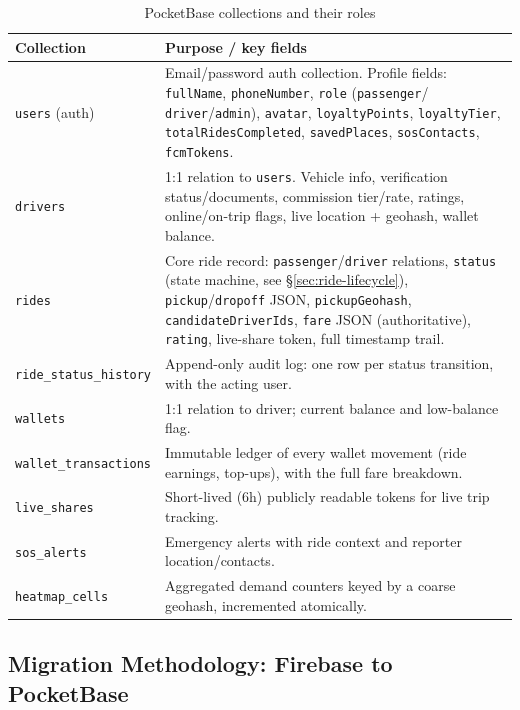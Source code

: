 \documentclass[11pt,a4paper]{article}
\begin{document}
\begin{table}[htbp]
\centering
\caption{PocketBase collections and their roles}
\label{tab:collections}
\begin{tabular}{@{}p{3.0cm}p{9.5cm}@{}}
\toprule
\textbf{Collection} & \textbf{Purpose / key fields} \\
\midrule
\texttt{users} (auth) & Email/password auth collection. Profile fields:
\texttt{fullName}, \texttt{phoneNumber}, \texttt{role} (\texttt{passenger}/
\texttt{driver}/\texttt{admin}), \texttt{avatar}, \texttt{loyaltyPoints},
\texttt{loyaltyTier}, \texttt{totalRidesCompleted}, \texttt{savedPlaces},
\texttt{sosContacts}, \texttt{fcmTokens}. \\
\texttt{drivers} & 1:1 relation to \texttt{users}. Vehicle info, verification
status/documents, commission tier/rate, ratings, online/on-trip flags,
live location + geohash, wallet balance. \\
\texttt{rides} & Core ride record: \texttt{passenger}/\texttt{driver} relations,
\texttt{status} (state machine, see \S\ref{sec:ride-lifecycle}),
\texttt{pickup}/\texttt{dropoff} JSON, \texttt{pickupGeohash},
\texttt{candidateDriverIds}, \texttt{fare} JSON (authoritative), \texttt{rating},
live-share token, full timestamp trail. \\
\texttt{ride\_status\_history} & Append-only audit log: one row per status
transition, with the acting user. \\
\texttt{wallets} & 1:1 relation to driver; current balance and low-balance
flag. \\
\texttt{wallet\_transactions} & Immutable ledger of every wallet movement
(ride earnings, top-ups), with the full fare breakdown. \\
\texttt{live\_shares} & Short-lived (6h) publicly readable tokens for live
trip tracking. \\
\texttt{sos\_alerts} & Emergency alerts with ride context and reporter
location/contacts. \\
\texttt{heatmap\_cells} & Aggregated demand counters keyed by a coarse
geohash, incremented atomically. \\
\bottomrule
\end{tabular}
\end{table}

\subsection{Migration Methodology: Firebase to PocketBase}
\label{sec:migration}
\end{document}
